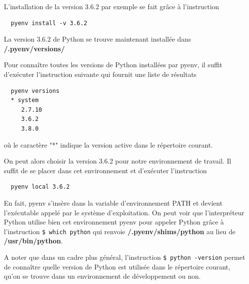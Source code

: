 \documentclass[twoside,a4paper,11pt,frenchb,openany]{report}
\begin{document}
L'installation de la version 3.6.2 par exemple se fait grâce à l'instruction
\begin{verbatim}  pyenv install -v 3.6.2\end{verbatim}

La version 3.6.2 de Python se trouve maintenant installée dans \textbf{\raisebox{-1ex}{\textasciitilde}/.pyenv/versions/}

Pour connaître toutes les versions de Python installées par pyenv, il suffit d'exécuter l'instruction suivante qui fournit une liste de résultats
\begin{verbatim}  pyenv versions
  * system
     2.7.10
     3.6.2
     3.8.0\end{verbatim}
où le caractère "*" indique la version active dans le répertoire courant.

On peut alors choisir la version 3.6.2 pour notre environnement de travail. Il suffit de se placer dans cet environnement et d'exécuter l'instruction
\begin{verbatim}  pyenv local 3.6.2\end{verbatim}

En fait, pyenv s'insère dans la variable d'environnement PATH et devient l'exécutable appelé par le système d'exploitation. On peut voir que l'interpréteur Python utilise bien cet environnement pyenv pour appeler Python grâce à l'instruction
\texttt{\$ which python}
qui renvoie \textbf{\raisebox{-1ex}{\textasciitilde}/.pyenv/shims/python} au lieu de \textbf{/usr/bin/python}.

A noter que dans un cadre plus général, l'instruction
\texttt{\$ python \textemdash-version}
permet de connaître quelle version de Python est utilisée dans le répertoire courant, qu'on se trouve dans un environnement de développement ou non.
\end{document}
